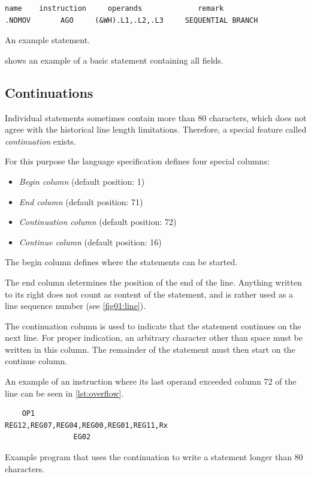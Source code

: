 \begin{listing}[t]
	\begin{verbatim}
name    instruction     operands             remark
.NOMOV       AGO     (&WH).L1,.L2,.L3     SEQUENTIAL BRANCH
	\end{verbatim}
	\caption{An example statement.}
	\label{lst:small_example}
\end{listing}

 shows an example of a basic statement containing all fields.

\subsection{Continuations}
\label{Continuation}

Individual statements sometimes contain more than 80 characters, which does not agree with the historical line length limitations. Therefore, a special feature called \emph{continuation} exists.

For this purpose the language specification defines four special columns:
\begin{itemize}
	\item \emph{Begin column} (default position: 1)
	
	\item \emph{End column} (default position: 71)
	
	\item \emph{Continuation column} (default position: 72)
	
	\item \emph{Continue column} (default position: 16)
\end{itemize}

The begin column defines where the statements can be started.

The end column determines the position of the end of the line. Anything written to its right does not count as content of the statement, and is rather used as a line sequence number (see \cref{fig01:line}).

The continuation column is used to indicate that the statement continues on the next line. For proper indication, an arbitrary character other than space must be written in this column. The remainder of the statement must then start on the continue column.

An example of an instruction where its last operand exceeded column 72 of the line can be seen in \cref{lst:overflow}.

\begin{listing}[t]
	\begin{verbatim}
    OP1                            REG12,REG07,REG04,REG00,REG01,REG11,Rx
                EG02
	\end{verbatim}
	\caption{Example program that uses the continuation to write a statement longer than 80 characters.}
	\label{lst:overflow}
\end{listing}

